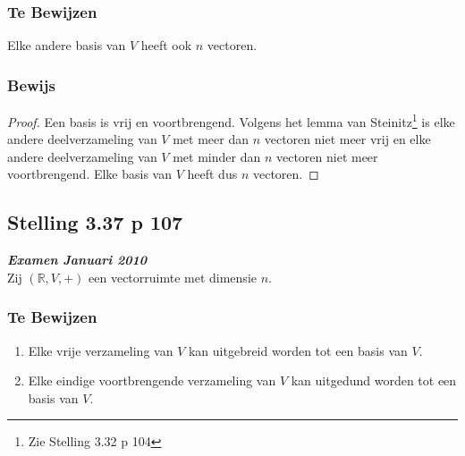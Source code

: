 \documentclass[lineaire_algebra_oplossingen.tex]{subfiles}
\begin{document}
\subsubsection*{Te Bewijzen}
Elke andere basis van $V$ heeft ook $n$ vectoren.

\subsubsection*{Bewijs}
\begin{proof}
Een basis is vrij en voortbrengend.
Volgens het lemma van Steinitz\footnote{Zie Stelling 3.32 p 104} is elke andere deelverzameling van $V$ met meer dan $n$ vectoren niet meer vrij en elke andere deelverzameling van $V$ met minder dan $n$ vectoren niet meer voortbrengend. Elke basis van $V$ heeft dus $n$ vectoren.
\end{proof}


\subsection{Stelling 3.37 p 107}
\label{3.37}
\textit{\textbf{Examen Januari 2010}}\\
Zij $(\mathbb{R},V,+)$ een vectorruimte met dimensie $n$.

\subsubsection*{Te Bewijzen}
\begin{enumerate}
\item Elke vrije verzameling van $V$ kan uitgebreid worden tot een basis van $V$.
\item Elke eindige voortbrengende verzameling van $V$ kan uitgedund worden tot een basis van $V$.
\end{enumerate}
\end{document}
